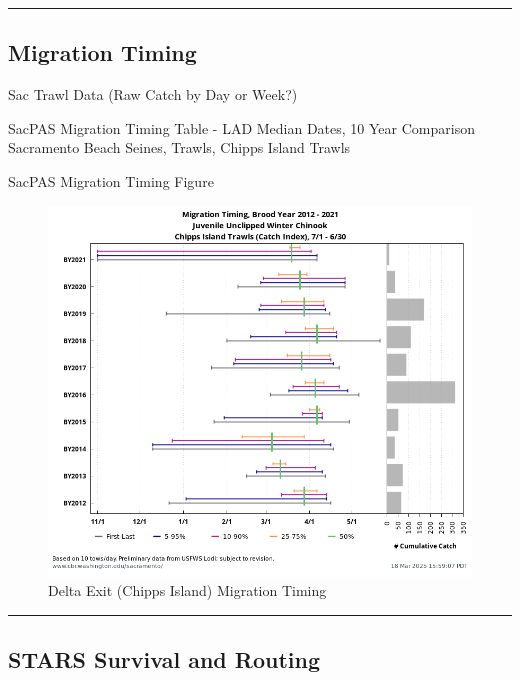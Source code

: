 \documentclass[
]{book}
\theoremstyle{definition}
\theoremstyle{definition}
\theoremstyle{definition}
\theoremstyle{definition}
\theoremstyle{remark}
\begin{document}
\begin{center}\rule{0.5\linewidth}{0.5pt}\end{center}

\hypertarget{migration-timing-2}{%
\subsection{Migration Timing}\label{migration-timing-2}}

Sac Trawl Data (Raw Catch by Day or Week?)

SacPAS Migration Timing Table - LAD Median Dates, 10 Year Comparison Sacramento Beach Seines, Trawls, Chipps Island Trawls

SacPAS Migration Timing Figure

\begin{figure}
\includegraphics[width=1.5\linewidth]{figures/migtiming2021_chipps} \caption{Delta Exit (Chipps Island) Migration Timing}\label{fig:chipps-timing-fig}
\end{figure}

\begin{center}\rule{0.5\linewidth}{0.5pt}\end{center}

\hypertarget{stars-survival-and-routing}{%
\subsection{STARS Survival and Routing}\label{stars-survival-and-routing}}
\end{document}
